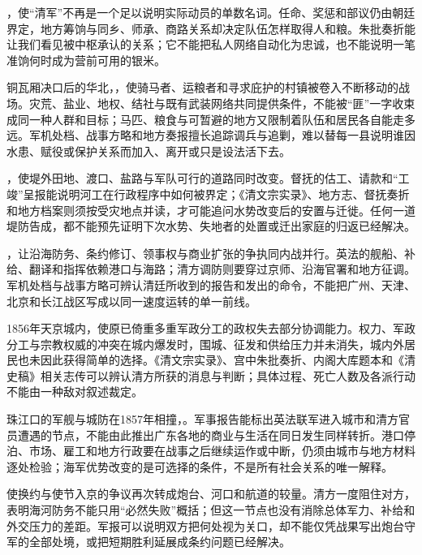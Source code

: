 ，使“清军”不再是一个足以说明实际动员的单数名词。任命、奖惩和部议仍由朝廷界定，地方筹饷与同乡、师承、商路关系却决定队伍怎样取得人和粮。朱批奏折能让我们看见被中枢承认的关系；它不能把私人网络自动化为忠诚，也不能说明一笔准饷何时成为营前可用的银米。

铜瓦厢决口后的华北，，使骑马者、运粮者和寻求庇护的村镇被卷入不断移动的战场。灾荒、盐业、地权、结社与既有武装网络共同提供条件，不能被“匪”一字收束成同一种人群和目标；马匹、粮食与可暂避的地方又限制着队伍和居民各自能走多远。军机处档、战事方略和地方奏报擅长追踪调兵与追剿，难以替每一县说明谁因水患、赋役或保护关系而加入、离开或只是设法活下去。

，使堤外田地、渡口、盐路与军队可行的道路同时改变。督抚的估工、请款和“工竣”呈报能说明河工在行政程序中如何被界定；《清文宗实录》、地方志、督抚奏折和地方档案则须按受灾地点并读，才可能追问水势改变后的安置与迁徙。任何一道堤防告成，都不能预先证明下次水势、失地者的处置或迁出家庭的归返已经解决。

，让沿海防务、条约修订、领事权与商业扩张的争执同内战并行。英法的舰船、补给、翻译和指挥依赖港口与海路；清方调防则要穿过京师、沿海官署和地方征调。军机处档与战事方略可辨认清廷所收到的报告和发出的命令，不能把广州、天津、北京和长江战区写成以同一速度运转的单一前线。

1856年天京城内，使原已倚重多重军政分工的政权失去部分协调能力。权力、军政分工与宗教权威的冲突在城内爆发时，围城、征发和供给压力并未消失，城内外居民也未因此获得简单的选择。《清文宗实录》、宫中朱批奏折、内阁大库题本和《清史稿》相关志传可以辨认清方所获的消息与判断；具体过程、死亡人数及各派行动不能由一种敌对叙述裁定。

珠江口的军舰与城防在1857年相撞，。军事报告能标出英法联军进入城市和清方官员遭遇的节点，不能由此推出广东各地的商业与生活在同日发生同样转折。港口停泊、市场、雇工和地方行政要在战事之后继续运作或中断，仍须由城市与地方材料逐处检验；海军优势改变的是可选择的条件，不是所有社会关系的唯一解释。

使换约与使节入京的争议再次转成炮台、河口和航道的较量。清方一度阻住对方，表明海河防务不能只用“必然失败”概括；但这一节点也没有消除总体军力、补给和外交压力的差距。军报可以说明双方把何处视为关口，却不能仅凭战果写出炮台守军的全部处境，或把短期胜利延展成条约问题已经解决。

